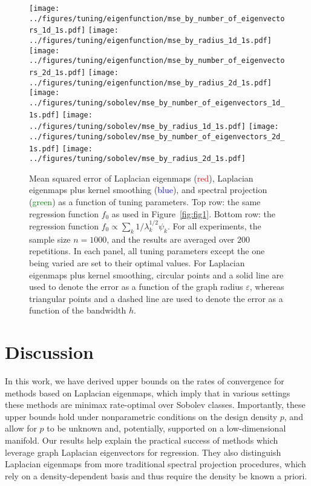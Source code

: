 \begin{figure*}[tb]
	\texttt{[image: ../figures/tuning/eigenfunction/mse\_by\_number\_of\_eigenvectors\_1d\_1s.pdf]}
	\texttt{[image: ../figures/tuning/eigenfunction/mse\_by\_radius\_1d\_1s.pdf]} 
	\texttt{[image: ../figures/tuning/eigenfunction/mse\_by\_number\_of\_eigenvectors\_2d\_1s.pdf]}
	\texttt{[image: ../figures/tuning/eigenfunction/mse\_by\_radius\_2d\_1s.pdf]} 
	\texttt{[image: ../figures/tuning/sobolev/mse\_by\_number\_of\_eigenvectors\_1d\_1s.pdf]}
	\texttt{[image: ../figures/tuning/sobolev/mse\_by\_radius\_1d\_1s.pdf]}
	\texttt{[image: ../figures/tuning/sobolev/mse\_by\_number\_of\_eigenvectors\_2d\_1s.pdf]}
	\texttt{[image: ../figures/tuning/sobolev/mse\_by\_radius\_2d\_1s.pdf]}  
	\caption{Mean squared error of Laplacian eigenmaps (\textcolor{red}{red}), Laplacian eigenmaps plus kernel smoothing (\textcolor{blue}{blue}), and spectral projection (\textcolor{green}{green}) as a function of tuning parameters. Top row: the same regression function $f_0$ as used in Figure~\ref{fig:fig1}. Bottom row: the regression function $f_0 \propto \sum_{k} 1/\lambda_k^{1/2} \psi_k$. For all experiments, the sample size $n = 1000$, and the results are averaged over $200$ repetitions. In each panel, all tuning parameters except the one being varied are set to their optimal values. For Laplacian eigenmaps plus kernel smoothing, circular points and a solid line are used to denote the error as a function of the graph radius $\varepsilon$, whereas triangular points and a dashed line are used to denote the error as a function of the bandwidth $h$.}
	\label{fig:fig3}
\end{figure*}

\section{Discussion}
\label{sec:discussion}

In this work, we have derived upper bounds on the rates of convergence for methods based on Laplacian eigenmaps, which imply that in various settings these methods are minimax rate-optimal over Sobolev classes. Importantly, these upper bounds hold under nonparametric conditions on the design density $p$, and allow for $p$ to be unknown and, potentially, supported on a low-dimensional manifold. Our results help explain the practical success of methods which leverage graph Laplacian eigenvectors for regression. They also distinguish Laplacian eigenmaps from more traditional spectral projection procedures, which rely on a density-dependent basis and thus require the density be known a priori.

